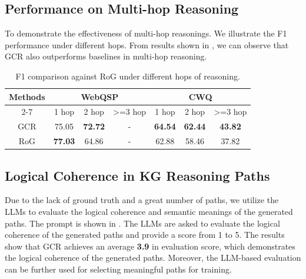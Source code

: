 {    \subsection{Performance on Multi-hop Reasoning}\label{app:multi_hops}
    To demonstrate the effectiveness of multi-hop reasonings. We illustrate the F1 performance under different hops. From results shown in , we can observe that GCR also outperforms baselines in multi-hop reasoning.

    \begin{table}[h!]
        \centering
        \caption{F1 comparison against RoG under different hops of reasoning.}
        \label{tab:multi_hops}
        \begin{tabular}{@{}c|cccccc@{}}
            \toprule
            \multirow{2}{*}{Methods} & \multicolumn{3}{c}{WebQSP} & \multicolumn{3}{c}{CWQ}                                                                                                      \\ \cmidrule(l){2-7}
                                     & 1 hop                      & 2 hop                   & \multicolumn{1}{c|}{\textgreater{}=3 hop} & 1 hop          & 2 hop          & \textgreater{}=3 hop \\ \midrule
            GCR                      & 75.05                      & \textbf{72.72}          & \multicolumn{1}{c|}{-}                    & \textbf{64.54} & \textbf{62.44} & \textbf{43.82}       \\
            RoG                      & \textbf{77.03}             & 64.86                   & \multicolumn{1}{c|}{-}                    & 62.88          & 58.46          & 37.82                \\ \bottomrule
        \end{tabular}%
    \end{table}
}

\subsection{Logical Coherence in KG Reasoning Paths}\label{app:logical_coherence}
Due to the lack of ground truth and a great number of paths, we utilize the LLMs to evaluate the logical coherence and semantic meanings of the generated paths. The prompt is shown in . The LLMs are asked to evaluate the logical coherence of the generated paths and provide a score from 1 to 5. The results show that GCR achieves an average \textbf{3.9} in evaluation score, which demonstrates the logical coherence of the generated paths. Moreover, the LLM-based evaluation can be further used for selecting meaningful paths for training.

